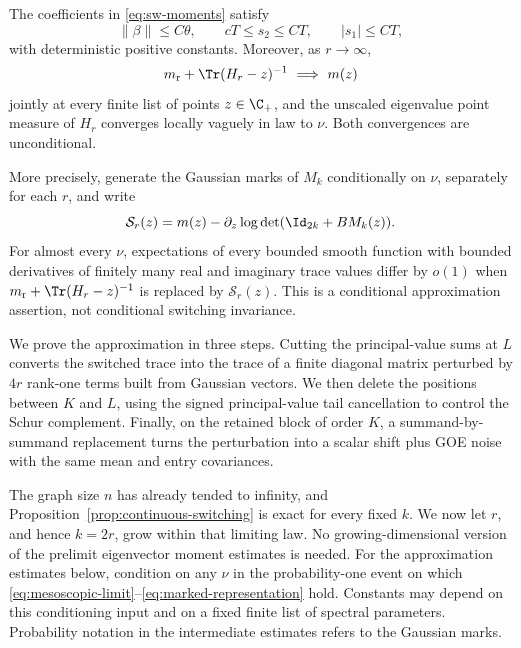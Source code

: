\begin{proposition}\label{prop:gaussian-insertion}
The coefficients in \eqref{eq:sw-moments} satisfy
\begin{equation}\label{eq:sw-coefficient-bounds}
 \|\beta\|\le C\theta,\qquad
 cT\le s_2\le CT,\qquad |s_1|\le CT,
\end{equation}
with deterministic positive constants. Moreover, as \(r\to\infty\),
\begin{equation}\label{eq:sw-trace-limit}
 m_{\rm r}+\Tr(H_r-z)^{-1}
 \ \Longrightarrow\ m(z)
\end{equation}
jointly at every finite list of points \(z\in\C_+\), and the unscaled
eigenvalue point measure of \(H_r\) converges locally vaguely in law to
\(\nu\). Both convergences are unconditional.

More precisely, generate the Gaussian marks of \(M_k\) conditionally on
\(\nu\), separately for each \(r\), and write
\[
 \mathcal S_r(z)
 =m(z)-\partial_z\log\det(\Id_{2k}+BM_k(z)).
 \]
For almost every \(\nu\), expectations of every bounded smooth function with
bounded derivatives of finitely many real and imaginary trace values differ
by \(o(1)\) when
\(m_{\rm r}+\Tr(H_r-z)^{-1}\) is replaced by \(\mathcal S_r(z)\).
This is a conditional approximation assertion, not conditional switching
invariance.
\end{proposition}

We prove the approximation in three steps. Cutting the principal-value
sums at \(L\) converts the switched trace into the trace of a finite
diagonal matrix perturbed by \(4r\) rank-one terms built from Gaussian
vectors. We then
delete the positions between \(K\) and \(L\), using the signed
principal-value tail cancellation to control the Schur complement.
Finally, on the retained block of order \(K\), a summand-by-summand
replacement turns the perturbation into a scalar shift plus GOE noise
with the same mean and entry covariances.

The graph size \(n\) has already tended to infinity, and
Proposition~\ref{prop:continuous-switching} is exact for every fixed \(k\).
We now let \(r\), and hence \(k=2r\), grow within that limiting law.
No growing-dimensional version of the prelimit eigenvector moment estimates
is needed. For the approximation estimates below, condition on any \(\nu\)
in the probability-one event on which
\eqref{eq:mesoscopic-limit}--\eqref{eq:marked-representation} hold.
Constants may depend on this conditioning input and on a fixed finite list
of spectral parameters. Probability notation in the intermediate estimates
refers to the Gaussian marks.

